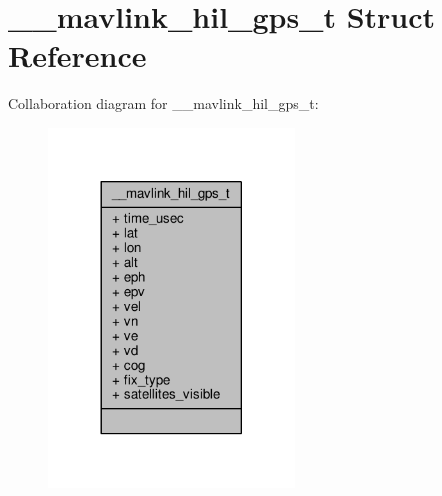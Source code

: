 \hypertarget{struct____mavlink__hil__gps__t}{\section{\+\_\+\+\_\+mavlink\+\_\+hil\+\_\+gps\+\_\+t Struct Reference}
\label{struct____mavlink__hil__gps__t}
}


Collaboration diagram for \+\_\+\+\_\+mavlink\+\_\+hil\+\_\+gps\+\_\+t\+:
\nopagebreak
\begin{figure}[H]
\begin{center}
\leavevmode
\includegraphics[width=185pt]{struct____mavlink__hil__gps__t__coll__graph}
\end{center}
\end{figure}
